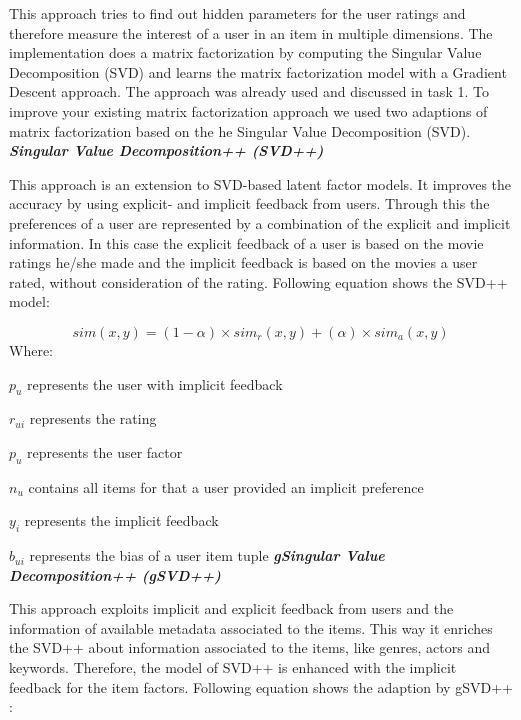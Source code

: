\documentclass{sigish}
\begin{document}
This approach tries to find out hidden parameters for the user ratings and therefore measure the interest of a user in an item in multiple dimensions. The implementation does a matrix factorization by computing the Singular Value Decomposition (SVD) and learns the matrix factorization model with a Gradient Descent approach. The approach was already used and discussed in task 1. 
\newline
\newline
To improve your existing matrix factorization approach we used two adaptions of matrix factorization based on the he Singular Value Decomposition (SVD).
\newline
\newline
\textbf{\emph{Singular Value Decomposition++ (SVD++) }}
\newline

This approach is an extension to SVD-based latent factor models. It improves the accuracy by using explicit- and implicit feedback from users. Through this the preferences of a user are represented by a combination of the explicit and implicit information.
\newline
In this case the explicit feedback of a user is based on the movie ratings he/she made and the implicit feedback is based on the movies a user rated, without consideration of the rating.
Following equation shows the SVD++ model:

\begin{equation}
sim(x, y) = (1 - \alpha) \times sim_{r}(x, y) + (\alpha) \times sim_{a}(x, y)
\end{equation}
\newline
Where:

$ p_{u} $ represents the user with implicit feedback

$ r_{ui} $ represents the rating

$ p_{u} $ represents the user factor

$ n_{u} $ contains all items for that a user provided an implicit preference

$ y_{i} $ represents the implicit feedback

$ b_{ui} $ represents the bias of a user item tuple
\newline
\newline
\textbf{\emph{gSingular Value Decomposition++ (gSVD++) }}
\newline

This approach exploits implicit and explicit feedback from users and the information of available metadata associated to the items. This way it enriches the SVD++ about information associated to the items, like genres, actors and keywords.
\newline
Therefore, the model of SVD++ is enhanced with the implicit feedback for the item factors.
Following equation shows the adaption by gSVD++ :
\end{document}
